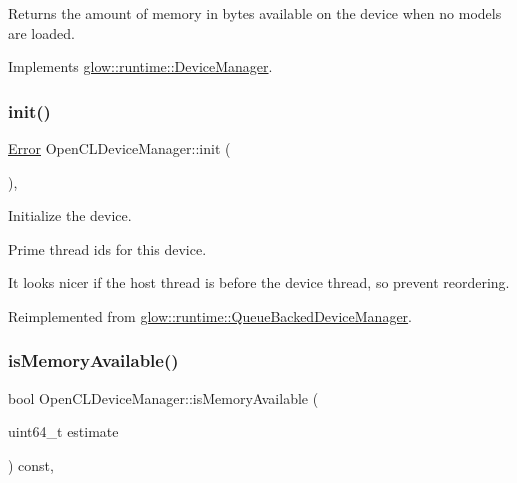 Returns the amount of memory in bytes available on the device when no models are loaded. 

Implements \hyperlink{classglow_1_1runtime_1_1_device_manager_ad158f1c1f9f32b48927f50d48f80decb}{glow\+::runtime\+::\+Device\+Manager}.

\mbox{\label{classglow_1_1runtime_1_1_open_c_l_device_manager_a2706d96882b6a599abd732449f96bdab}} 
\subsubsection{\texorpdfstring{init()}{init()}}
{\footnotesize\ttfamily \hyperlink{namespaceglow_afdb176c3a672ef66db0ecfc19a8d39bf}{Error} Open\+C\+L\+Device\+Manager\+::init (\begin{DoxyParamCaption}{ }\end{DoxyParamCaption})\hspace{0.3cm}{\ttfamily [override]}, {\ttfamily [virtual]}}



Initialize the device. 

Prime thread ids for this device.

It looks nicer if the host thread is before the device thread, so prevent reordering. 

Reimplemented from \hyperlink{classglow_1_1runtime_1_1_queue_backed_device_manager_a25d93d146f471024d9a8c9d0da193838}{glow\+::runtime\+::\+Queue\+Backed\+Device\+Manager}.

\mbox{\label{classglow_1_1runtime_1_1_open_c_l_device_manager_ab94967240f9d1ef5ae26f3a242488809}} 
\subsubsection{\texorpdfstring{is\+Memory\+Available()}{isMemoryAvailable()}}
{\footnotesize\ttfamily bool Open\+C\+L\+Device\+Manager\+::is\+Memory\+Available (\begin{DoxyParamCaption}\item[{uint64\+\_\+t}]{estimate }\end{DoxyParamCaption}) const\hspace{0.3cm}{\ttfamily [override]}, {\ttfamily [virtual]}}

